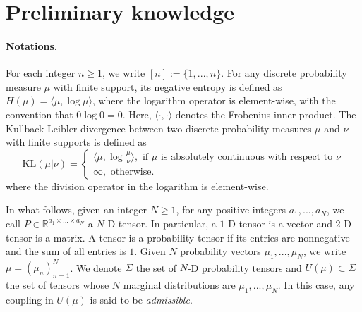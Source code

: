 \documentclass{article}
\begin{document}

\section{Preliminary knowledge}

\paragraph{Notations.} For each integer $n \geq 1$, we write $[n] := \{1,...,n\}$. For any discrete probability measure 
$\mu$ with finite support, its negative entropy is defined as $H(\mu) = \langle \mu, \log \mu \rangle$, where the logarithm 
operator is element-wise, with the convention that $0 \log 0 = 0$. Here, $\langle \cdot, \cdot \rangle$ denotes the Frobenius 
inner product. The Kullback-Leibler divergence between two discrete probability measures $\mu$ and $\nu$ with finite supports is
defined as 
\begin{equation*}
  \text{KL}(\mu \vert \nu) = 
  \begin{cases}
    \langle \mu, \log\frac{\mu}{\nu} \rangle, \text{ if } \mu \text{ is absolutely continuous with respect to } \nu \\
    \infty, \text{ otherwise}.
  \end{cases}
\end{equation*}
where the division operator in the logarithm is element-wise.

In what follows, given an integer $N \geq 1$, for any positive integers $a_1,..., a_N$, we call 
$P \in \mathbb R^{a_1 \times ... \times a_N}$ a $N$-D tensor. In particular, a $1$-D tensor is a vector and $2$-D tensor is a matrix. 
A tensor is a probability tensor if its entries are nonnegative and the sum of all entries is $1$. 
Given $N$ probability vectors $\mu_1, ..., \mu_N$, we write $\mu = (\mu_n)_{n=1}^N$.
We denote $\Sigma$ the set of $N$-D probability tensors and 
$U(\mu) \subset \Sigma$ the set of tensors whose $N$ marginal distributions are $\mu_1, ..., \mu_N$. In this case, any coupling 
in $U(\mu)$ is said to be \textit{admissible}.
\end{document}
